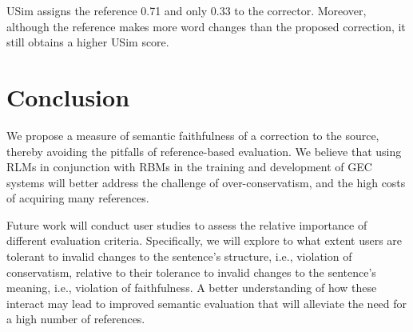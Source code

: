 \documentclass[a4paper, 11pt]{article}
\begin{document}
{\sc USim} assigns the reference 0.71 and only 0.33 to the corrector.
Moreover, although the reference makes more word changes than the proposed correction,
it still obtains a higher {\sc USim} score.


%
%
%

\section{Conclusion}

We propose a measure of semantic faithfulness of a correction to the source,
thereby avoiding the pitfalls of reference-based evaluation. 
We believe that using RLMs in conjunction with RBMs in the training and development of GEC
systems will better address the challenge of over-conservatism, and the 
high costs of acquiring many references.

Future work will conduct user studies to assess the relative importance
of different evaluation criteria.
Specifically, we will explore to what extent users are
tolerant to invalid changes to the sentence's structure, i.e.,
violation of conservatism, relative to their tolerance to invalid changes 
to the sentence's meaning, i.e., violation of faithfulness.
A better understanding of how these interact
may lead to improved semantic evaluation that will alleviate the need
for a high number of references.




\end{document}
